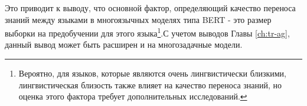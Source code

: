 Это приводит к выводу, что основной фактор, определяющий качество переноса знаний между языками в многоязычных моделях типа BERT - это размер выборки на предобучении для этого языка\footnote{Вероятно, для языков, которые являются очень лингвистически близкими, лингвистическая близость также влияет на качество переноса знаний, но оценка этого фактора требует дополнительных исследований.}.С учетом выводов Главы \ref{ch:tr-ag}, данный вывод может быть расширен и на многозадачные модели. 



